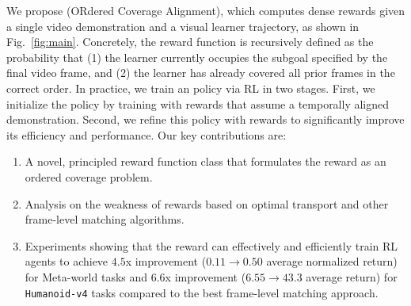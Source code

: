 
We propose \orca{} (ORdered Coverage Alignment), which computes dense rewards given a single video demonstration and a visual learner trajectory, as shown in Fig.~\ref{fig:main}.
Concretely, the reward function is recursively defined as the probability that (1) the learner currently occupies the subgoal specified by the final video frame, and (2) the learner has already covered all prior frames in the correct order. 
In practice, we train an \orca{} policy via RL in two stages.
First, we initialize the policy by training with rewards that assume a temporally aligned demonstration.
Second, we refine this policy with \orca{} rewards to significantly improve its efficiency and performance.
Our key contributions are:
\vspace{-1em}
\begin{enumerate}[leftmargin=*]
    \setlength{\itemsep}{0pt}
    \item A novel, principled reward function class \orca{} that formulates the reward as an ordered coverage problem. 
    \item Analysis on the weakness of rewards based on optimal transport and other frame-level matching algorithms. 
    \item Experiments showing that the \orca{} reward can effectively and efficiently train RL agents to achieve $4.5$x improvement ($0.11 \rightarrow 0.50$ average normalized return) for Meta-world tasks and $6.6$x improvement ($6.55 \rightarrow 43.3$ average return) for \texttt{Humanoid-v4} tasks compared to the best frame-level matching approach.
\end{enumerate}


